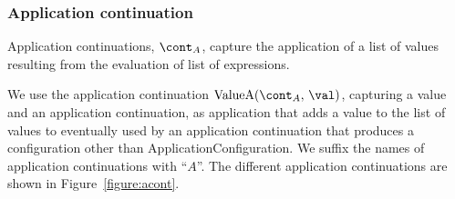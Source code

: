 \documentclass[a4paper,oneside]{article}
\begin{document}
\subsubsection{Application continuation}
\label{subsubsec:application-continuation}

Application continuations, $\acont$, capture the application of a list of values resulting from the evaluation of list of expressions.

\newcommand{\ValueA}[2]{\mathrm{ValueA}({#1},\,{#2})}
\newcommand{\StringConcatenationA}{\mathrm{StringConcatenationA(\econt)}}
\newcommand{\SuperMethodA}[1]{\mathrm{SuperMethodA}(\idmeta,\,\env,\,#1,\,\ExceptionHandlersRest,\,\econt)}
\newcommand{\StaticInvA}[4]{\mathrm{StaticInvocationA}({#1},\,{#2},\,{#3},\,\ExceptionHandlersRest,\,{#4})}
\newcommand{\DInstanceMethodA}{\mathrm{DInstanceMethodA}(\membermeta,\,\val,\,\ExceptionHandlers,\,\econt)}
\newcommand{\FieldsA}[4]{\mathrm{FieldsA}({#1},\,{#2},\,{#3},\,\strace,\,\handler,\,\cstrace,\,\cex,\,{#4})}
\newcommand{\SuperA}[3]{\mathrm{SuperA}({#1},\,{#2},\,\strace,\,\handler,\,\cstrace,\,\cex,\,{#3})}
\newcommand{\ConstructorA}[3]{\mathrm{ConstructorA}({#1},\,{#2},\,\handler,\,\cstrace,\,\cex,\,{#3})}
\newcommand{\RedirectingA}[3]{\mathrm{RedirectingA}({#1},\,{#2},\,\strace,\,\handler,\,\cstrace,\,\cex,\,{#3})}
\newcommand{\ForInitA}[1]{\mathrm{ForInitA}(\mathrm{\varmeta{s}},\, #1,\, \exprs,\, \statementmeta,\, \env,\, \lbls,\, \clbls,\, \handler,\, \cstrace,\, \cex,\, \econt,\, \scont)}
\newcommand{\ForUpdatesA}[2]{\mathrm{ForUpdatesA}(\mathrm{\varmeta{s}},\, #1,\, \exprs,\, \statementmeta,\, \env,\, #2,\, \lbls,\, \clbls,\, \handler,\, \cstrace,\, \cex,\, \econt,\, \scont)}
\newcommand{\InstanceMethodA}{\mathrm{InstanceMethodA(\idmeta,\,\val,\,\strace,\,\handler,\,\cstrace,\,\cex,\,\econt)}}

We use the application continuation $\ValueA{\acont}{\val}$, capturing a value and an application continuation, as application that adds a value to the list of values to eventually used by an application continuation that produces a configuration other than ApplicationConfiguration.
We suffix the names of application continuations with ``$A$''.
The different application continuations are shown in Figure~\ref{figure:acont}.
\end{document}
